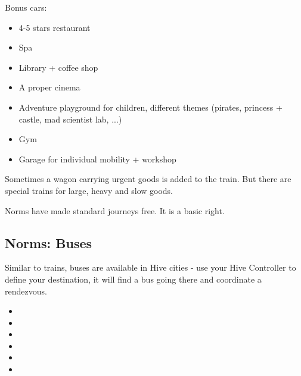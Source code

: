 Bonus cars:

\begin{itemize}
    \item 4-5 stars restaurant
    \item Spa
    \item Library + coffee shop
    \item A proper cinema
    \item Adventure playground for children, different themes (pirates, princess + castle, mad scientist lab, ...)
    \item Gym
    \item Garage for individual mobility + workshop
\end{itemize}

Sometimes a wagon carrying urgent goods is added to the train. But there are special trains for large, heavy and slow goods.

Norms have made standard journeys free. It is a basic right.

\subsection{Norms: Buses}

Similar to trains, buses are available in Hive cities - use your Hive Controller to define your destination, it will find a bus going there and coordinate a rendezvous.

\begin{normtalk}[title=This bus is haunted]
    \begin{itemize}
        \item {}
        \item {}
        \item {}
        \item {}
        \item {}
        \item {}
    \end{itemize}
\end{normtalk}




